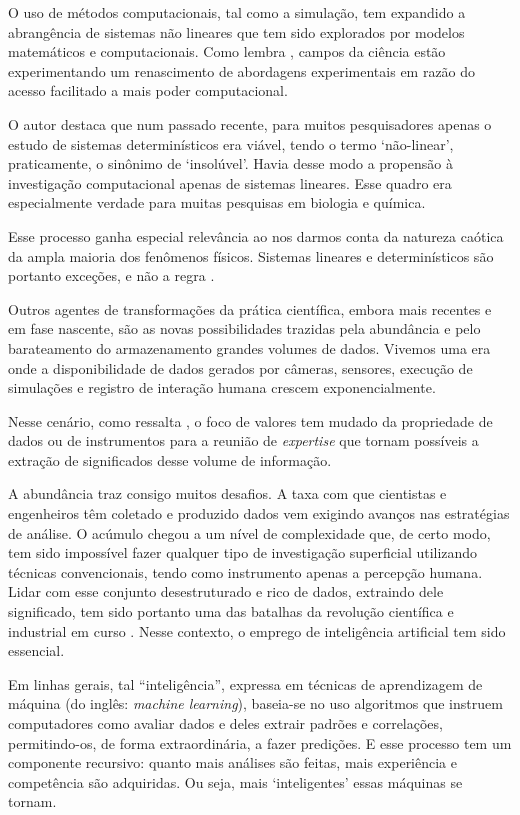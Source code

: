 O uso de métodos computacionais, tal como a simulação, tem expandido a abrangência de sistemas não lineares que tem sido explorados por modelos matemáticos e computacionais. Como lembra , campos da ciência estão experimentando um renascimento de abordagens experimentais em razão do acesso facilitado a mais poder computacional. 

O autor destaca que num passado recente, para muitos pesquisadores apenas o estudo de sistemas determinísticos era viável, tendo o termo `não-linear', praticamente, o sinônimo de `insolúvel'. Havia desse modo a propensão à investigação computacional apenas de sistemas lineares. Esse quadro era especialmente verdade para muitas pesquisas em biologia e química. 

Esse processo ganha especial relevância ao nos darmos conta da natureza caótica da ampla maioria dos fenômenos físicos. Sistemas lineares e determinísticos são portanto exceções, e não a regra \cite[]{Weintrop2016}.

Outros agentes de transformações da prática científica, embora mais recentes e em fase nascente, são as novas possibilidades trazidas pela abundância e pelo barateamento do armazenamento grandes volumes de dados. Vivemos uma era onde a disponibilidade de dados gerados por câmeras, sensores, execução de simulações e registro de interação humana crescem exponencialmente. 

Nesse cenário, como ressalta , o foco de valores tem mudado da propriedade de dados ou de instrumentos para a reunião de \textit{expertise} que tornam possíveis a extração de significados desse volume de informação. 

A abundância traz consigo muitos desafios. A taxa com que cientistas e engenheiros têm coletado e produzido dados vem exigindo avanços nas estratégias de análise. O acúmulo chegou a um nível de complexidade que, de certo modo, tem sido impossível fazer qualquer tipo de investigação superficial utilizando técnicas convencionais, tendo como instrumento apenas a percepção humana. Lidar com esse conjunto desestruturado e rico de dados, extraindo dele significado, tem sido portanto uma das batalhas da revolução científica e industrial em curso \cite[]{Djorgovski2005}. Nesse contexto, o emprego de inteligência artificial tem sido essencial.

Em linhas gerais, tal ``inteligência'', expressa em técnicas de aprendizagem de máquina (do inglês: \textit{machine learning}), baseia-se no uso algoritmos que instruem computadores como avaliar dados e deles extrair padrões e correlações, permitindo-os, de forma extraordinária, a fazer predições. E esse processo tem um componente recursivo: quanto mais análises são feitas, mais experiência e competência são adquiridas. Ou seja, mais `inteligentes' essas máquinas se tornam.

